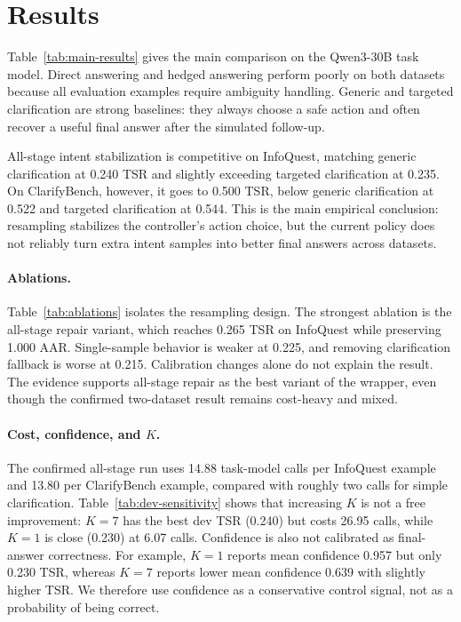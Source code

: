 \section{Results}

Table~\ref{tab:main-results} gives the main comparison on the Qwen3-30B task model. Direct answering and hedged answering perform poorly on both datasets because all evaluation examples require ambiguity handling. Generic and targeted clarification are strong baselines: they always choose a safe action and often recover a useful final answer after the simulated follow-up.

All-stage intent stabilization is competitive on InfoQuest, matching generic clarification at 0.240 TSR and slightly exceeding targeted clarification at 0.235. On ClarifyBench, however, it goes to 0.500 TSR, below generic clarification at 0.522 and targeted clarification at 0.544. This is the main empirical conclusion: resampling stabilizes the controller's action choice, but the current policy does not reliably turn extra intent samples into better final answers across datasets.



\paragraph{Ablations.}
Table~\ref{tab:ablations} isolates the resampling design. The strongest ablation is the all-stage repair variant, which reaches 0.265 TSR on InfoQuest while preserving 1.000 AAR. Single-sample behavior is weaker at 0.225, and removing clarification fallback is worse at 0.215. Calibration changes alone do not explain the result. The evidence supports all-stage repair as the best variant of the wrapper, even though the confirmed two-dataset result remains cost-heavy and mixed.



\paragraph{Cost, confidence, and \(K\).}
The confirmed all-stage run uses 14.88 task-model calls per InfoQuest example and 13.80 per ClarifyBench example, compared with roughly two calls for simple clarification. Table~\ref{tab:dev-sensitivity} shows that increasing \(K\) is not a free improvement: \(K=7\) has the best dev TSR (0.240) but costs 26.95 calls, while \(K=1\) is close (0.230) at 6.07 calls. Confidence is also not calibrated as final-answer correctness. For example, \(K=1\) reports mean confidence 0.957 but only 0.230 TSR, whereas \(K=7\) reports lower mean confidence 0.639 with slightly higher TSR. We therefore use confidence as a conservative control signal, not as a probability of being correct.


